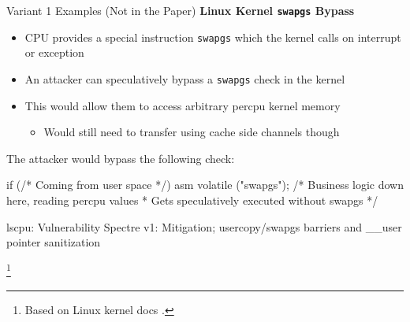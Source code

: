 \documentclass[10pt, dvipsnames, aspectratio=169]{beamer}
\newcommand\ufootnote[1]{%
    \begingroup
        \renewcommand\thefootnote{}\footnote{\hspace{-1.8em}#1}%
        \addtocounter{footnote}{-1}%
    \endgroup
}
\begin{document}
\begin{frame}[c,fragile]{Variant 1 Examples (Not in the Paper)}{}
  {\bf Linux Kernel {\tt swapgs} Bypass}
  \begin{itemize}
    \item CPU provides a special instruction {\tt swapgs} which the kernel calls on interrupt or exception
    \item An attacker can speculatively bypass a {\tt swapgs} check in the kernel
    \item This would allow them to access arbitrary percpu kernel memory
    \begin{itemize}
      \item Would still need to transfer using cache side channels though
    \end{itemize}
  \end{itemize}

  \vfill
  The attacker would bypass the following check:
  \begin{listing}[language=c,gobble=4,xleftmargin=1em]
    if (/* Coming from user space */)
      asm volatile ("swapgs");
    /* Business logic down here, reading percpu values
     * Gets speculatively executed without swapgs */
  \end{listing}

  \vfill
  \begin{listing}[language=none,gobble=4,xleftmargin=1em]
    lscpu:
    Vulnerability Spectre v1:        Mitigation; usercopy/swapgs barriers and __user pointer sanitization
  \end{listing}

  \ufootnote{Based on Linux kernel docs \cite{linux_hwvuln}.}
\end{frame}
\end{document}
